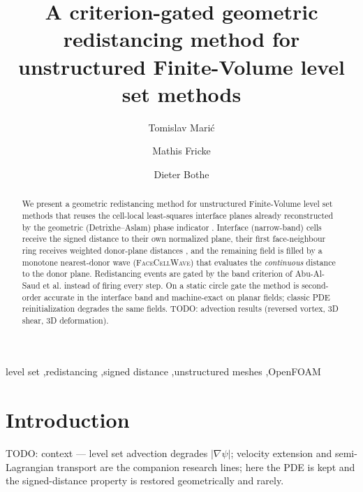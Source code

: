 \documentclass[preprint,3p,11pt]{elsarticle}
\newcommand{\psilev}{\psi}
\newcommand{\gradpsi}{\nabla\psilev}
\begin{document}
\begin{frontmatter}

\title{A criterion-gated geometric redistancing method for unstructured
       Finite-Volume level set methods}

\author[tuda]{Tomislav Mari\'{c}}
\author[tuda]{Mathis Fricke}
\author[tuda]{Dieter Bothe}
\address[tuda]{Mathematical Modeling and Analysis, TU Darmstadt, Germany}

\begin{abstract}
We present a geometric redistancing method for unstructured Finite-Volume
level set methods that reuses the cell-local least-squares interface planes
already reconstructed by the geometric (Detrixhe--Aslam) phase indicator
\cite{detrixhe2016}. Interface (narrow-band) cells receive the signed
distance to their own normalized plane, their first face-neighbour ring
receives weighted donor-plane distances \cite{scheufler2019}, and the
remaining field is filled by a monotone nearest-donor wave
(\textsc{FaceCellWave}) that evaluates the \emph{continuous} distance to the
donor plane. Redistancing events are gated by the band criterion of
Abu-Al-Saud et al. \cite{abualsaud2018} instead of firing every step. On a
static circle gate the method is second-order accurate in the interface band
and machine-exact on planar fields; classic PDE reinitialization
\cite{sussman1994} degrades the same fields. TODO: advection results
(reversed vortex, 3D shear, 3D deformation).
\end{abstract}

\begin{keyword}
level set \sep redistancing \sep signed distance \sep unstructured meshes
\sep OpenFOAM
\end{keyword}

\end{frontmatter}

\section{Introduction}
\label{sec:intro}
TODO: context — level set advection degrades $|\gradpsi|$; velocity
extension \cite{adalsteinsson1999} and semi-Lagrangian transport are the
companion research lines; here the PDE is kept and the signed-distance
property is restored geometrically and rarely.
\end{document}
